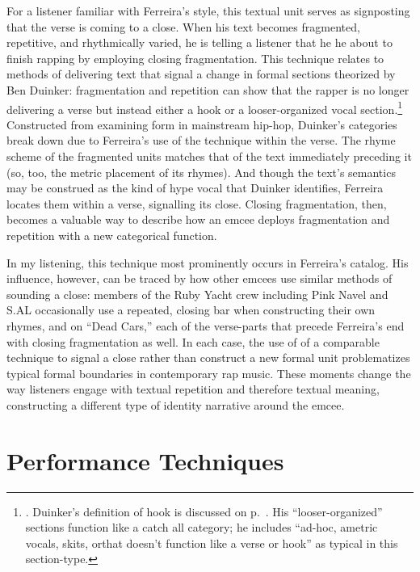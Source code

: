 For a listener familiar with Ferreira's style, this textual unit serves as signposting that the verse is
coming to a close. When his text becomes fragmented, repetitive, and rhythmically varied, he is telling
a listener that he he about to finish rapping by employing closing fragmentation. This technique relates
to methods of delivering text that signal a change in formal sections theorized by Ben Duinker:
fragmentation and repetition can show that the rapper is no longer delivering a verse but instead either
a hook or a looser-organized vocal section.\footnote{
    \autocite[98--101]{benduinkerSongFormMainstreaming2020}. Duinker's definition of hook is 
    discussed on p.~\pageref{duinkerhookdef}. His ``looser-organized'' sections function like
    a catch all category; he includes ``ad-hoc, ametric vocals, skits, or\textellipsis [rapping]
    that doesn't function like a verse or hook'' as typical in this section-type.}
Constructed from examining form in mainstream hip-hop, Duinker's categories break down due to Ferreira's 
use of the technique within the verse. The rhyme scheme of the fragmented units matches that of the text
immediately preceding it (so, too, the metric placement of its rhymes). And though the text's semantics
may be construed as the kind of hype vocal that Duinker identifies, Ferreira locates them within a verse,
signalling its close. Closing fragmentation, then, becomes a valuable way to describe how an emcee deploys
fragmentation and repetition with a new categorical function.

In my listening, this technique most prominently occurs in Ferreira's catalog. His influence, however, can
be traced by how other emcees use similar methods of sounding a close: members of the Ruby Yacht crew including
Pink Navel and S.AL occasionally use a repeated, closing bar when constructing their own rhymes, and on ``Dead
Cars,'' each of the verse-parts that precede Ferreira's end with closing fragmentation as well. In each case,
the use of of a comparable technique to signal a close rather than construct a new formal unit problematizes
typical formal boundaries in contemporary rap music. These moments change the way listeners engage with textual
repetition and therefore textual meaning, constructing a different type of identity narrative around the emcee.

\section{Performance Techniques}

